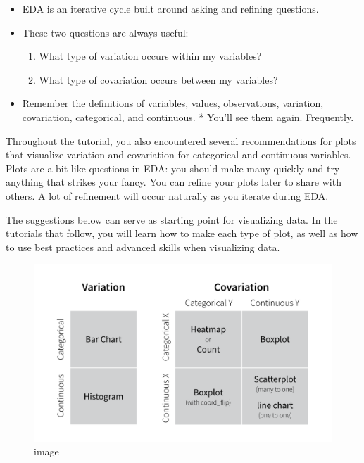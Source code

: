 \documentclass[
]{article}
\providecommand{\tightlist}{%
  \setlength{\itemsep}{0pt}\setlength{\parskip}{0pt}}
\begin{document}
\begin{itemize}
\tightlist
\item
  EDA is an iterative cycle built around asking and refining questions.
\item
  These two questions are always useful:

  \begin{enumerate}
  \def\labelenumi{\arabic{enumi}.}
  \tightlist
  \item
    What type of variation occurs within my variables?
  \item
    What type of covariation occurs between my variables?
  \end{enumerate}
\item
  Remember the definitions of variables, values, observations,
  variation, covariation, categorical, and continuous. * You'll see them
  again. Frequently.
\end{itemize}

Throughout the tutorial, you also encountered several recommendations
for plots that visualize variation and covariation for categorical and
continuous variables. Plots are a bit like questions in EDA: you should
make many quickly and try anything that strikes your fancy. You can
refine your plots later to share with others. A lot of refinement will
occur naturally as you iterate during EDA.

The suggestions below can serve as starting point for visualizing data.
In the tutorials that follow, you will learn how to make each type of
plot, as well as how to use best practices and advanced skills when
visualizing data.

\begin{figure}
\centering
\includegraphics{data/plots-table_3.png}
\caption{image}
\end{figure}
\end{document}
